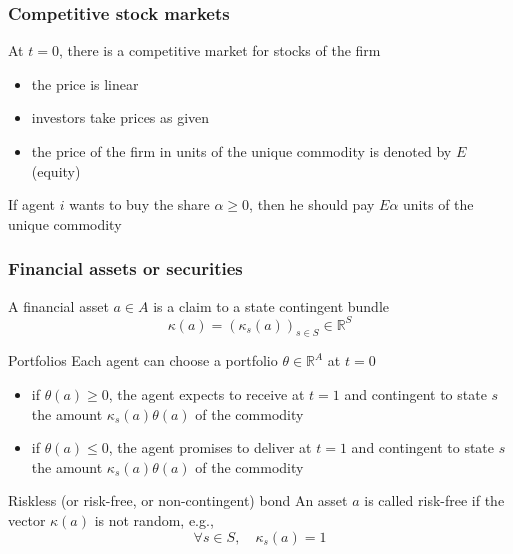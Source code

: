 \documentclass[blue]{beamer}
\def\R{\mathbb{R}}
\def\leq{\leqslant}
\def\geq{\geqslant}
\theoremstyle{definition}
\theoremstyle{example}
\begin{document}

\begin{frame}\frametitle{Competitive stock markets}

At $t=0$, there is a competitive market for stocks of the firm
    \begin{itemize}
    \item the price is linear
    \item investors take prices as given
    \item the price of the firm in units of the unique commodity is denoted by $E$ (equity)
    \end{itemize}
If agent $i$ wants to buy the share $\alpha \geq 0$, then he should pay $E \alpha$ units of the unique commodity


\end{frame}


\begin{frame}\frametitle{Financial assets or securities}

A financial asset $a \in A$ is a claim to a state contingent bundle
\[
\kappa(a) =(\kappa_s(a))_{s\in S} \in \R^S
\]

\begin{block}{Portfolios}
Each agent can choose a portfolio $\theta \in \R^A$ at $t=0$
\begin{itemize}
\item if $\theta(a) \geq 0$, the agent expects to receive at $t=1$ and contingent to state $s$ the amount $\kappa_s(a) \theta(a)$ of the commodity
\item if $\theta(a) \leq 0$, the agent promises to deliver at $t=1$ and contingent to state $s$ the amount $\kappa_s(a) \theta(a)$ of the commodity
\end{itemize}
\end{block}

\begin{block}{Riskless (or risk-free, or non-contingent) bond}
An asset $a$ is called risk-free if the vector $\kappa(a)$ is not random, e.g.,
\[
\forall s\in S, \quad \kappa_s(a) = 1
\]
\end{block}

\end{frame}

\end{document}
